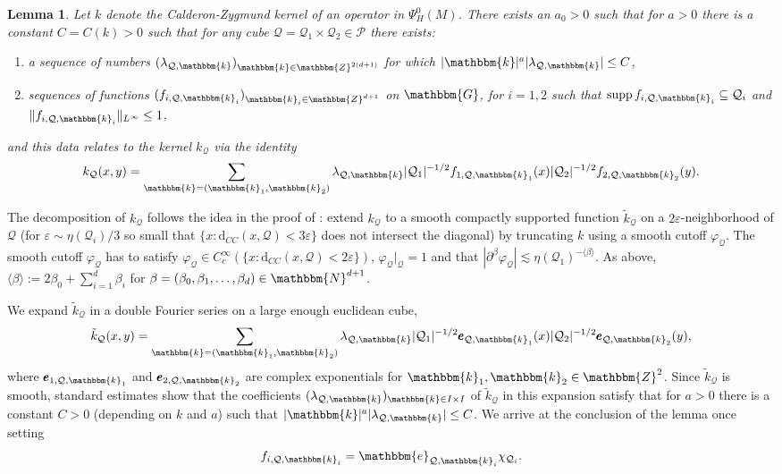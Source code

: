 \documentclass[10pt]{amsart}
\newtheorem{lem}[thm]{Lemma}
\theoremstyle{remark}
\theoremstyle{definition}
\begin{document}
\begin{lem}
Let $k$ denote the Calderon-Zygmund kernel of an operator in $\Psi^0_H(M)$. There exists an $a_0>0$ such that for $a>0$ there is a constant $C=C(k)>0$ such that for any cube $\mathcal{Q}=\mathcal{Q}_1\times \mathcal{Q}_2\in \mathcal{P}$ there exists:
\begin{enumerate}
\item a sequence of numbers $(\lambda_{\mathcal{Q},\mathbbm{k}})_{\mathbbm{k}\in {\mathbbm{Z}}^{2(d+1)}}$ for which $|\mathbbm{k}|^a |\lambda_{\mathcal{Q},\mathbbm{k}}|\leq C$,
\item sequences of functions $(f_{i,\mathcal{Q},\mathbbm{k}_i})_{\mathbbm{k}_i\in {\mathbbm{Z}}^{d+1}}$ on $\mathbbm{G}$, for $i=1,2$ such that ${\mathrm{s} \mathrm{u} \mathrm{p} \mathrm{p}\,} f_{i,\mathcal{Q},\mathbbm{k}_i}\subseteq \mathcal{Q}_i$ and $\|f_{i,\mathcal{Q},\mathbbm{k}_i}\|_{L^\infty}\leq 1$,
\end{enumerate} 
and this data relates to the kernel $k_\mathcal{Q}$ via the identity
$$k_\mathcal{Q}(x,y)=\sum_{\mathbbm{k}=(\mathbbm{k}_1,\mathbbm{k}_2)}\lambda_{\mathcal{Q},\mathbbm{k}} |\mathcal{Q}_1|^{-1/2} f_{1,\mathcal{Q},\mathbbm{k}_1}(x)|\mathcal{Q}_2|^{-1/2} f_{2,\mathcal{Q},\mathbbm{k}_2}(y).$$
\end{lem}

The decomposition of $k_\mathcal{Q}$ follows the idea in the proof of \cite[Lemma 2.9]{rochbergsemmes}: extend $k_\mathcal{Q}$ to a smooth compactly supported function $\tilde{k}_{\mathcal{Q}}$ on a $2{\varepsilon}$-neighborhood of $\mathcal{Q}$ (for ${\varepsilon}\sim\eta(\mathcal{Q}_i)/3$ so small that $\{x:{\mathrm{d}}_{CC}(x,\mathcal{Q})<3{\varepsilon}\}$ does not intersect the diagonal) by truncating $k$ using a smooth cutoff $\varphi_\mathcal{Q}$. The smooth cutoff $\varphi_\mathcal{Q}$ has to satisfy $\varphi_\mathcal{Q}\in C^\infty_c(\{x:{\mathrm{d}}_{CC}(x,\mathcal{Q})<2{\varepsilon}\})$, $\varphi_\mathcal{Q}|_{\mathcal{Q}}=1$ and that $|\partial^{\beta}\varphi_{\mathcal{Q}}|\lesssim \eta(\mathcal{Q}_1)^{-\langle \beta\rangle}$. As above, $\langle \beta\rangle:=2\beta_0+\sum _{i=1}^d \beta_i$ for $\beta=(\beta_0,\beta_1,\ldots,\beta_d)\in {\mathbbm{N}}^{d+1}$. 

We expand $\tilde{k}_{\mathcal{Q}}$ in a double Fourier series on a large enough euclidean cube, 
$$\tilde{k}_{\mathcal{Q}}(x,y)=\sum_{\mathbbm{k}=(\mathbbm{k}_1,\mathbbm{k}_2)}\lambda_{\mathcal{Q},\mathbbm{k}} |\mathcal{Q}_1|^{-1/2} \pmb{e}_{\mathcal{Q},\mathbbm{k}_1}(x)|\mathcal{Q}_2|^{-1/2} \pmb{e}_{\mathcal{Q},\mathbbm{k}_2}(y),$$
where $\pmb{e}_{1,\mathcal{Q},\mathbbm{k}_1}$ and $\pmb{e}_{2,\mathcal{Q},\mathbbm{k}_2}$ are complex exponentials for $\mathbbm{k}_1,\mathbbm{k}_2\in{\mathbbm{Z}}^2$. Since $\tilde{k}_\mathcal{Q}$ is smooth, standard estimates show that the coefficients $(\lambda_{\mathcal{Q},\mathbbm{k}})_{\mathbbm{k}\in I\times I}$ of $\tilde{k}_\mathcal{Q}$ in this expansion satisfy that for $a>0$ there is a constant $C>0$ (depending on $k$ and $a$) such that $|\mathbbm{k}|^a |\lambda_{\mathcal{Q},\mathbbm{k}}|\leq C$. We arrive at the conclusion of the lemma once setting 
$$f_{i,\mathcal{Q},\mathbbm{k}_i}=\mathbbm{e}_{\mathcal{Q},\mathbbm{k}_i}\chi_{\mathcal{Q}_i}.$$
\end{document}
